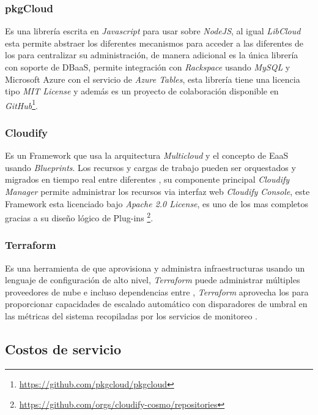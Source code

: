 \subsubsection{pkgCloud}
Es una librería escrita en \emph{Javascript} para usar sobre \emph{NodeJS}, al igual \emph{LibCloud} esta permite abstraer los diferentes mecanismos para acceder a las diferentes  de los  para centralizar su administración, de manera adicional es la única librería con soporte de \acrshort{DBaaS}, permite integración con \emph{Rackspace} usando \emph{MySQL} y \gls{Microsoft Azure} con el servicio de \emph{Azure Tables}, esta librería tiene una licencia tipo \emph{MIT License} y además es un proyecto de colaboración disponible en \emph{GitHub}\footnote{\url{https://github.com/pkgcloud/pkgcloud}}.\bigskip

\subsubsection{Cloudify}
Es un \gls{Framework} que usa la arquitectura \emph{Multicloud} y el concepto de \acrfull{EaaS} usando \emph{Blueprints}. Los recursos y cargas de trabajo pueden ser orquestados y migrados en tiempo real entre diferentes , su componente principal \emph{Cloudify Manager} permite administrar los recursos via interfaz web \emph{Cloudify Console}, este \gls{Framework} esta licenciado bajo \emph{Apache 2.0 License}, es uno de los  mas completos gracias a su diseño lógico de \glspl{Plug-in} \footnote{\url{https://github.com/orgs/cloudify-cosmo/repositories}}.\bigskip

\subsubsection{Terraform}
Es una herramienta de  que aprovisiona y administra infraestructuras usando un lenguaje de configuración de alto nivel, \emph{Terraform} puede administrar múltiples proveedores de nube e incluso dependencias entre , \emph{Terraform} aprovecha los  para proporcionar capacidades de escalado automático con disparadores de umbral en las métricas del sistema recopiladas por los servicios de monitoreo \cite[p.14]{tomarchio2020cloud}. \bigskip


\subsection{Costos de servicio}
